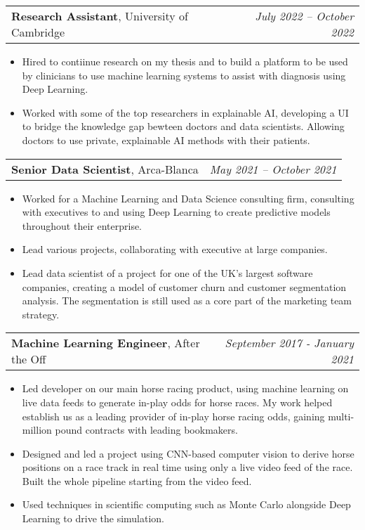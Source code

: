 \documentclass[letterpaper,11pt]{article}
\makeatletter
\newcommand{\CVItem}[1]{
  \item{
    {#1 \vspace{0pt}}
  }
}
\newcommand{\CVSubHeading}[4]{
  \vspace{4pt}\item
    \begin{tabular*}{0.985\textwidth}[t]{l@{\extracolsep{\fill}}r}
      \textbf{#1}, {#3} & \textit{#4} \\
    \end{tabular*}\vspace{-3pt}
}
\newcommand{\CVItemListStart}{\begin{itemize}}
\newcommand{\CVItemListEnd}{\end{itemize}\vspace{-3pt}}
\makeatother
\begin{document}
    \CVSubHeading{Research Assistant}{}{University of Cambridge}{July 2022 – October 2022}
        \CVItemListStart
            \CVItem{
                Hired to contiinue research on my thesis and to build a platform to be used by clinicians to use machine learning systems to assist with diagnosis using Deep Learning.
            }
            \CVItem{
                Worked with some of the top researchers in explainable AI, developing a UI to bridge the knowledge gap bewteen doctors and data scientists. Allowing doctors to use private, explainable AI methods with their patients.
            }
        \CVItemListEnd

    \CVSubHeading{Senior Data Scientist}{}{Arca-Blanca}{May 2021 – October 2021}
        \CVItemListStart
            \CVItem{
                Worked for a Machine Learning and Data Science consulting firm, consulting with executives to and using Deep Learning to create predictive models throughout their enterprise.
            }
            \CVItem{
                Lead various projects, collaborating with executive at large companies.
            }
            \CVItem{
                Lead data scientist of a project for one of the UK's largest software companies, creating a model of customer churn and customer segmentation analysis. The segmentation is still used as a core part of the marketing team strategy. 
            }
        \CVItemListEnd

    \CVSubHeading{Machine Learning Engineer}{}{After the Off}{September 2017 - January 2021}
        \CVItemListStart
            \CVItem{
                Led developer on our main horse racing product, using machine learning on live data feeds to generate in-play odds for horse races. My work helped establish us as a leading provider of in-play horse racing odds, gaining multi-million pound contracts with leading bookmakers.
            }
            \CVItem{
                Designed and led a project using CNN-based computer vision to derive horse positions on a race track in real time using only a live video feed of the race. Built the whole pipeline starting from the video feed.
            }
            \CVItem{
                Used techniques in scientific computing such as Monte Carlo alongside Deep Learning to drive the simulation.
            }
        \CVItemListEnd
\end{document}
